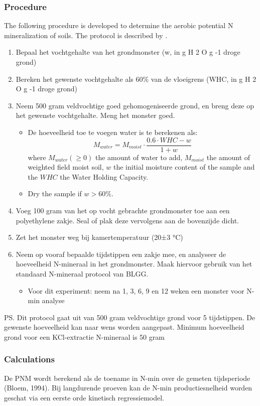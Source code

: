 \documentclass[10pt,twoside,dutch,english]{report}
\begin{document}
\begin{appendices}
\subsubsection{Procedure}
The following procedure is developed to determine the aerobic potential N mineralization of soils. The protocol is described by \citet{Ros2014}. 
\begin{enumerate}
\item Bepaal het vochtgehalte van het grondmonster (w, in g H 2 O g -1  droge grond) 
\item  Bereken het gewenste vochtgehalte als 60\% van de vloeigrens (WHC, in g H 2 O g -1  droge grond)
\item Neem 500 gram veldvochtige goed gehomogeniseerde grond, en breng deze op het gewenste 
vochtgehalte. Meng het monster goed. 
\begin{itemize}
\item De hoeveelheid toe te voegen water is te berekenen als: \begin{equation}  M_{water}=M_{moist} \cdot \frac{0.6\cdot WHC - w}{1 + w} \end{equation} where $M_{water} (\geq 0)$ the amount of water to add, $M_{moist}$ the amount of weighted field moist soil, $w$ the initial moisture content of the sample and the $WHC$ the Water Holding Capacity. 
\item Dry the sample if $w>60\%$. 
\end{itemize}
\item Voeg 100 gram van het op vocht gebrachte grondmonster toe aan een polyethylene zakje. Seal of plak deze vervolgens aan de bovenzijde dicht. 
\item Zet het monster weg bij kamertemperatuur (20±3 °C)
\item  Neem op vooraf bepaalde tijdstippen een zakje mee, en analyseer de hoeveelheid N-mineraal in het grondmonster. Maak hiervoor gebruik van het standaard N-mineraal protocol van BLGG. 
\begin{itemize}
\item Voor dit experiment: neem na 1, 3, 6, 9 en 12 weken een monster voor N-min analyse
\end{itemize}

\end{enumerate}
PS. Dit protocol gaat uit van 500 gram veldvochtige grond voor 5 tijdstippen. De gewenste hoeveelheid kan naar 
wens worden aangepast. Minimum hoeveelheid grond voor een KCl-extractie N-mineraal is 50 gram

\subsubsection{Calculations}
De PNM wordt berekend als de toename in N-min over de gemeten tijdsperiode (Bloem, 1994). Bij langdurende 
proeven kan de N-min productiesnelheid worden geschat via een eerste orde kinetisch regressiemodel. 


\end{appendices}
\end{document}
